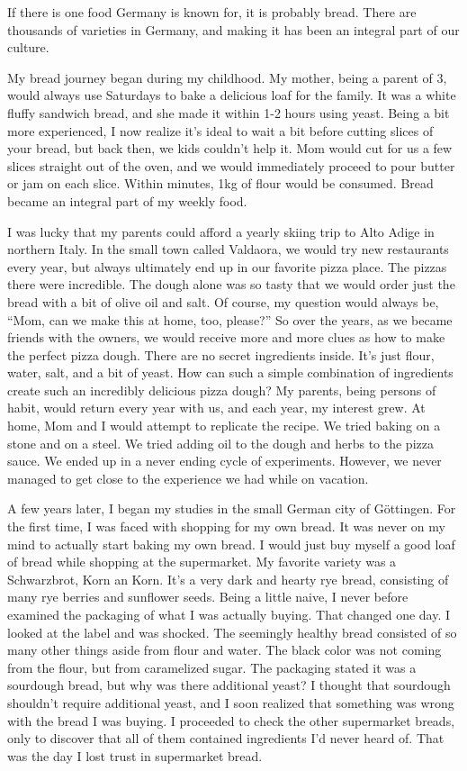 If there is one food Germany is known for, it is probably bread.
There are thousands of varieties in Germany,
and making it has been an integral part of our culture.

My bread journey began during my childhood. My mother, being a parent
of 3, would always use Saturdays to bake a delicious loaf for the family.
It was a white fluffy sandwich bread, and she made it within 1-2 hours using yeast.
Being a bit more experienced, I now realize it's
ideal to wait a bit before cutting slices of your bread, but back then,
we kids couldn't help it. Mom would cut for us a few slices straight out of the oven, and we would
immediately proceed to pour butter or jam on each slice. Within minutes, 1kg of
flour would be consumed. Bread became an integral part of my weekly food.

I was lucky that my parents could afford a yearly skiing trip to
Alto Adige in northern Italy. In the small town called Valdaora, we
would try new restaurants every year, but always ultimately end up in our favorite
pizza place. The pizzas there were incredible. The dough
alone was so tasty that we would order just the bread with a
bit of olive oil and salt.
Of course, my question would always be, ``Mom, can we make this at home, too, please?''
So over the years, as we became friends with the owners, we would receive
more and more clues as how to make the perfect pizza dough. There
are no secret ingredients inside. It's just flour, water, salt, and a bit of yeast.
How can such a simple combination of ingredients create such an incredibly delicious
pizza dough? My parents, being persons of habit, would return every year with us,
and each year, my interest grew. At home, Mom and I would attempt to replicate
the recipe. We tried baking on a stone and on a steel. We tried adding oil to the dough and herbs
to the pizza sauce. We ended up in a never ending cycle of experiments. However, we never managed
to get close to the experience we had while on vacation.

A few years later, I began my studies in the small German city of Göttingen.
For the first time, I was faced with shopping for my own bread. It was never
on my mind to actually start baking my own bread. I would just buy myself
a good loaf of bread while shopping at the supermarket. My favorite variety
was a Schwarzbrot, Korn an Korn. It's a very dark and hearty rye bread,
consisting of many rye berries and sunflower seeds. Being a little naive,
I never before examined the packaging of what I was actually buying. That
changed one day. I looked at the label and was shocked. The seemingly
healthy bread consisted of so many other things aside from flour and water.
The black color was not coming from the flour, but from caramelized sugar.
The packaging stated it was a sourdough bread, but why was there additional yeast?
I thought that sourdough shouldn't require additional yeast, and I soon realized that
something was wrong with the bread I was buying.
I proceeded to check the other supermarket breads, only to discover that all of them
contained ingredients I'd never heard of. That was the day I lost trust
in supermarket bread.

